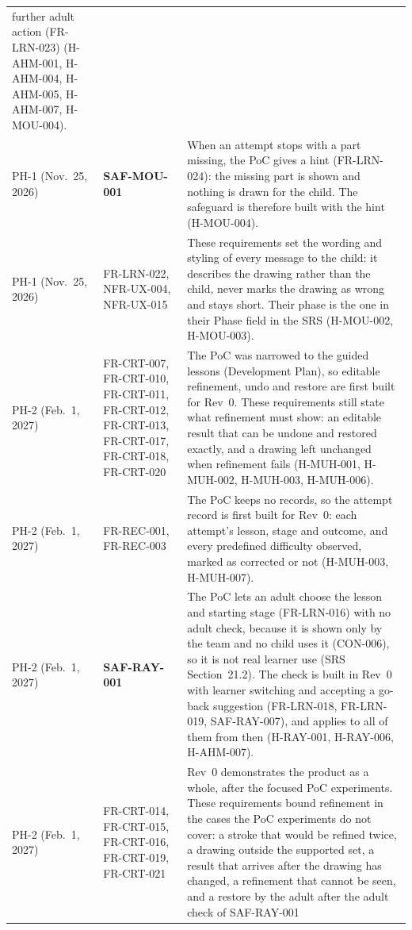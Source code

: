 \documentclass{article}
\begin{document}
{\begin{longtable}{@{}
  >{\raggedright\arraybackslash}p{1.7cm} >{\raggedright\arraybackslash}p{2.4cm}
  >{\raggedright\arraybackslash}p{\dimexpr\linewidth-4.1cm-4\tabcolsep\relax}
  @{}}
further adult action (FR-LRN-023) (H-AHM-001, H-AHM-004, H-AHM-005, H-AHM-007,
H-MOU-004).
\\
\addlinespace
PH-1 (Nov.~25, 2026) & \textbf{SAF-MOU-001} & When an attempt stops with a
part missing, the PoC gives a hint (FR-LRN-024): the missing part is shown and
nothing is drawn for the child. The safeguard is therefore built with the hint
(H-MOU-004). \\
\addlinespace
PH-1 (Nov.~25, 2026) & FR-LRN-022, NFR-UX-004, NFR-UX-015 & These requirements
set the wording and styling of every message to the child: it describes the
drawing rather than the child, never marks the drawing as wrong and stays short.
Their phase is the one in their Phase field in the SRS (H-MOU-002, H-MOU-003).
\\
\midrule
PH-2 (Feb.~1, 2027) & FR-CRT-007, FR-CRT-010, FR-CRT-011, FR-CRT-012,
FR-CRT-013, FR-CRT-017, FR-CRT-018, FR-CRT-020 & The PoC was narrowed to the
guided lessons (Development Plan), so editable refinement, undo and restore are
first built for Rev~0. These requirements still state what refinement must
show: an editable result that can be undone and restored exactly, and a drawing
left unchanged when refinement fails (H-MUH-001, H-MUH-002, H-MUH-003,
H-MUH-006). \\
\addlinespace
PH-2 (Feb.~1, 2027) & FR-REC-001, FR-REC-003 & The PoC keeps no records, so the
attempt record is first built for Rev~0: each attempt's lesson, stage and
outcome, and every predefined difficulty observed, marked as corrected or not
(H-MUH-003, H-MUH-007). \\
\addlinespace
PH-2 (Feb.~1, 2027) & \textbf{SAF-RAY-001} & The PoC lets an adult choose the
lesson and starting stage (FR-LRN-016) with no adult check, because it is shown
only by the team and no child uses it (CON-006), so it is not real learner use
(SRS Section~21.2). The check is built in Rev~0 with learner switching and
accepting a go-back suggestion (FR-LRN-018, FR-LRN-019, SAF-RAY-007), and
applies to all of them from then (H-RAY-001, H-RAY-006, H-AHM-007). \\
\addlinespace
PH-2 (Feb.~1, 2027) & FR-CRT-014, FR-CRT-015, FR-CRT-016, FR-CRT-019, FR-CRT-021
& Rev~0 demonstrates the product as a whole, after the focused PoC experiments.
These requirements bound refinement in the cases the PoC experiments do not
cover: a stroke that would be refined twice, a drawing outside the supported
set, a result that arrives after the drawing has changed, a refinement that
cannot be seen, and a restore by the adult after the adult check of SAF-RAY-001

\end{longtable}}
\end{document}
